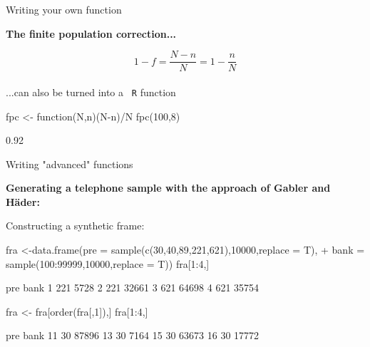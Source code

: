 \documentclass[11pt,german,hideothersubsections]{beamer}
\newcommand{\R}[1]{{\tt \color{blue}  #1}}
\begin{document}
\begin{frame}[fragile]{Writing your own function}
\begin{center}
\textbf{The finite population correction...}
\end{center}
\vspace{.25cm}
\begin{equation*}
1-f=\frac{N-n}{N}=1-\frac{n}{N}
\end{equation*}\\
\vspace{.5cm}
...can also be turned into a \R{R} function
\begin{Schunk}
\begin{Sinput}
 fpc <- function(N,n){(N-n)/N}
 fpc(100,8)
\end{Sinput}
\begin{Soutput}
[1] 0.92
\end{Soutput}
\end{Schunk}
\end{frame}
\begin{frame}[fragile]{Writing "advanced" functions}
\footnotesize{
\vspace{-.25cm}
\begin{center}
\textbf{Generating a telephone sample with the approach of Gabler and H\"ader:}
\end{center}
\vspace{.25cm}
Constructing a synthetic frame:
\begin{Schunk}
\begin{Sinput}
 fra <-data.frame(pre = sample(c(30,40,89,221,621),10000,replace = T),
+                  bank = sample(100:99999,10000,replace = T))
 fra[1:4,]
\end{Sinput}
\begin{Soutput}
  pre  bank
1 221  5728
2 221 32661
3 621 64698
4 621 35754
\end{Soutput}
\begin{Sinput}
 fra <- fra[order(fra[,1]),]
 fra[1:4,]
\end{Sinput}
\begin{Soutput}
   pre  bank
11  30 87896
13  30  7164
15  30 63673
16  30 17772
\end{Soutput}
\end{Schunk}
}
\end{frame}
\end{document}
